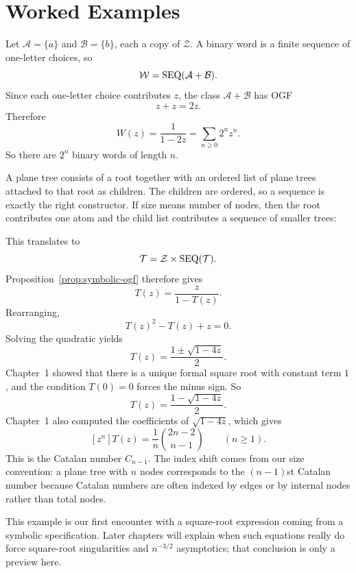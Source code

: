 \section{Worked Examples}

\begin{example}
Let $\mathcal{A}=\{a\}$ and $\mathcal{B}=\{b\}$, each a copy of $\mathcal{Z}$. A binary word is a finite sequence of one-letter choices, so
\[
  \mathcal{W} = \operatorname{SEQ}(\mathcal{A}+\mathcal{B}).
\]
Since each one-letter choice contributes $z$, the class $\mathcal{A}+\mathcal{B}$ has OGF
\[
  z+z = 2z.
\]
Therefore
\[
  W(z) = \frac{1}{1-2z} = \sum_{n \ge 0} 2^n z^n.
\]
So there are $2^n$ binary words of length $n$.
\end{example}

\begin{example}
A plane tree consists of a root together with an ordered list of plane trees attached to that root as children. The children are ordered, so a sequence is exactly the right constructor. If size means number of nodes, then the root contributes one atom and the child list contributes a sequence of smaller trees:

\begin{center}
\end{center}

This translates to
\[
  \mathcal{T} = \mathcal{Z} \times \operatorname{SEQ}(\mathcal{T}).
\]
Proposition~\ref{prop:symbolic-ogf} therefore gives
\[
  T(z) = \frac{z}{1-T(z)}.
\]
Rearranging,
\[
  T(z)^2 - T(z) + z = 0.
\]
Solving the quadratic yields
\[
  T(z) = \frac{1 \pm \sqrt{1-4z}}{2}.
\]
Chapter~1 showed that there is a unique formal square root with constant term $1$, and the condition $T(0)=0$ forces the minus sign. So
\[
  T(z) = \frac{1-\sqrt{1-4z}}{2}.
\]
Chapter~1 also computed the coefficients of $\sqrt{1-4z}$, which gives
\[
  [z^n]T(z) = \frac{1}{n}\binom{2n-2}{n-1} \qquad (n \ge 1).
\]
This is the Catalan number $C_{n-1}$. The index shift comes from our size convention: a plane tree with $n$ nodes corresponds to the $(n-1)$st Catalan number because Catalan numbers are often indexed by edges or by internal nodes rather than total nodes.

This example is our first encounter with a square-root expression coming from a symbolic specification. Later chapters will explain when such equations really do force square-root singularities and $n^{-3/2}$ asymptotics; that conclusion is only a preview here.
\end{example}

